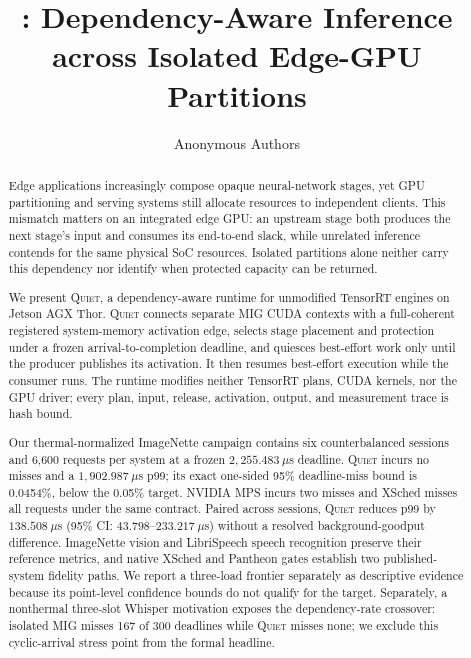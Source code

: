 \documentclass[sigconf,review,anonymous]{acmart}
\title{\sys: Dependency-Aware Inference across Isolated Edge-GPU Partitions}
\author{Anonymous Authors}
\affiliation{\institution{Anonymous Institution}\country{Anonymous Country}}
\newcommand{\sys}{\textsc{Quiet}\xspace}
\begin{document}
\begin{abstract}
Edge applications increasingly compose opaque neural-network stages, yet GPU
partitioning and serving systems still allocate resources to independent
clients.  This mismatch matters on an integrated edge GPU: an upstream stage
both produces the next stage's input and consumes its end-to-end slack, while
unrelated inference contends for the same physical SoC resources.  Isolated
partitions alone neither carry this dependency nor identify when protected
capacity can be returned.

We present \sys, a dependency-aware runtime for unmodified TensorRT engines on
Jetson AGX Thor.  \sys connects separate MIG CUDA contexts with a
full-coherent registered system-memory activation edge, selects stage
placement and protection under a frozen arrival-to-completion deadline, and
quiesces best-effort work only until the producer publishes its activation.
It then resumes best-effort execution while the consumer runs.  The runtime
modifies neither TensorRT plans, CUDA kernels, nor the GPU driver; every plan,
input, release, activation, output, and measurement trace is hash bound.

Our thermal-normalized ImageNette campaign contains six counterbalanced
sessions and 6,600 requests per system at a frozen $2{,}255.483~\mu$s
deadline.  \sys incurs no misses and a $1{,}902.987~\mu$s p99; its exact
one-sided 95\% deadline-miss bound is 0.0454\%, below the 0.05\% target.
NVIDIA MPS incurs two misses and XSched misses all requests under the same
contract.  Paired across sessions, \sys reduces p99 by $138.508~\mu$s
(95\% CI: $43.798$--$233.217~\mu$s) without a resolved background-goodput
difference.  ImageNette vision and LibriSpeech speech recognition preserve
their reference metrics, and native XSched and Pantheon gates establish two
published-system fidelity paths.  We report a three-load frontier separately
as descriptive evidence because its point-level confidence bounds do not
qualify for the target.  Separately, a nonthermal three-slot Whisper
motivation exposes the dependency-rate crossover: isolated MIG misses 167 of
300 deadlines while \sys misses none; we exclude this cyclic-arrival stress
point from the formal headline.
\end{abstract}

\maketitle











\end{document}
